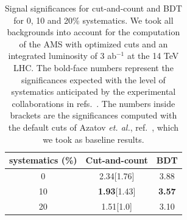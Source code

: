 %
\begin{table}[h]
\centering
\begin{tabular}{c|c|c}
\hline
systematics (\%) & Cut-and-count & BDT \\
\hline\hline 
0 & 2.34[1.76] & 3.88 \\
\hline
10 & {\bf 1.93}[1.43] & {\bf 3.57}  \\
\hline
20 & 1.51[1.0] & 3.10  \\
\hline\hline
\end{tabular}
\caption{Signal significances for cut-and-count and BDT for 0, 10 and 20\% systematics. We took all backgrounds into account for the computation of the AMS with optimized cuts and an integrated luminosity of 3 ab$^{-1}$ at the 14 TeV LHC. The bold-face numbers represent the significances expected with the level of systematics anticipated by the experimental collaborations in refs.~\cite{ATLAS14, ATLAS17, CMS}. The numbers inside brackets are the significances computed with the default cuts of Azatov \emph{et. al.}, ref.~\cite{Azatov:2015oxa}, which we took as baseline results.}
\label{table:resultsbdtKS}
\end{table}
%
%

